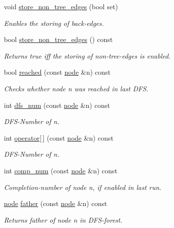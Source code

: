 \begin{DoxyCompactItemize}
void \mbox{\hyperlink{classdfs_a6f54f1c4339eacc8961e795439d4593d}{store\+\_\+non\+\_\+tree\+\_\+edges}} (bool set)
\begin{DoxyCompactList}\small\item\em Enables the storing of back-\/edges. \end{DoxyCompactList}\item 
bool \mbox{\hyperlink{classdfs_a6ac1f01ff594fbbc6e8d6b5bd03fc9ab}{store\+\_\+non\+\_\+tree\+\_\+edges}} () const
\begin{DoxyCompactList}\small\item\em Returns true iff the storing of non-\/tree-\/edges is enabled. \end{DoxyCompactList}\item 
bool \mbox{\hyperlink{classdfs_a2948061eb1ea02f57614f9044c8e63cf}{reached}} (const \mbox{\hyperlink{classnode}{node}} \&n) const
\begin{DoxyCompactList}\small\item\em Checks whether node {\itshape n} was reached in last D\+FS. \end{DoxyCompactList}\item 
int \mbox{\hyperlink{classdfs_a315f16831a0bd333960e87e045cb37c8}{dfs\+\_\+num}} (const \mbox{\hyperlink{classnode}{node}} \&n) const
\begin{DoxyCompactList}\small\item\em D\+F\+S-\/\+Number of {\itshape n}. \end{DoxyCompactList}\item 
int \mbox{\hyperlink{classdfs_a014b90894a47fa5abb7f4e5030be2c3e}{operator\mbox{[}$\,$\mbox{]}}} (const \mbox{\hyperlink{classnode}{node}} \&n) const
\begin{DoxyCompactList}\small\item\em D\+F\+S-\/\+Number of {\itshape n}. \end{DoxyCompactList}\item 
int \mbox{\hyperlink{classdfs_aceb066c806cb0beb5688b167a17387c7}{comp\+\_\+num}} (const \mbox{\hyperlink{classnode}{node}} \&n) const
\begin{DoxyCompactList}\small\item\em Completion-\/number of node {\itshape n}, if enabled in last run. \end{DoxyCompactList}\item 
\mbox{\hyperlink{classnode}{node}} \mbox{\hyperlink{classdfs_a3012717ce541b3e56943e2c2c50efdf6}{father}} (const \mbox{\hyperlink{classnode}{node}} \&n) const
\begin{DoxyCompactList}\small\item\em Returns father of node {\itshape n} in D\+F\+S-\/forest. \end{DoxyCompactList}\item 

\end{DoxyCompactItemize}
